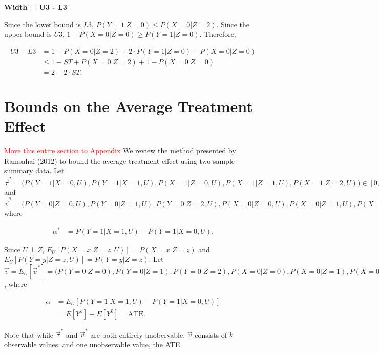 \documentclass[
]{article}
\theoremstyle{plain}
\begin{document}
\textbf{Width = U3 - L3}

Since the lower bound is \(L3\), \(P(Y = 1 | Z = 0) \le P(X = 0 | Z = 2)\). Since the upper bound is \(U3\), \(1 - P(X = 0 | Z = 0) \ge P(Y = 1 | Z = 0)\). Therefore,

\[\begin{aligned}
U3 - L3 &= 1 + P(X = 0 | Z = 2) + 2\cdot P(Y = 1 | Z = 0) - P(X = 0 | Z = 0) \\
        &\le 1 - ST + P(X = 0 | Z = 2) + 1 - P(X = 0 | Z = 0) \\
        &= 2 - 2\cdot ST.
\end{aligned}\]

\newpage

\hypertarget{bounds-on-average-treatment-effect}{%
\section{Bounds on the Average Treatment Effect}\label{bounds-on-average-treatment-effect}}
\textcolor{red}{Move this entire section to Appendix}
We review the method presented by Ramsahai (2012) to bound the average treatment effect using two-sample summary data. Let \(\vec{\tau}^* = \Big(P(Y = 1 | X = 0, U), P(Y = 1 | X = 1, U), P(X = 1 | Z = 0, U), P(X = 1 | Z = 1, U), P(X=1 | Z = 2, U) \Big) \in [0,1]^{5}\) and \(\vec{v}^* = \Big(P(Y = 0 | Z = 0, U),P(Y = 0 | Z = 1, U), P(Y = 0 | Z = 2, U), P(X = 0 | Z = 0, U),P(X = 0 | Z = 1, U), P(X=0 | Z= 2, U), \alpha^*\Big)\) where

\[
\begin{aligned}
\alpha^* &= P(Y = 1 | X = 1, U) - P(Y = 1 | X = 0, U).
\end{aligned}
\]

Since \(U \perp Z\), \(E_U[P(X = x | Z = z, U)] = P(X = x | Z = z)\) and \(E_U[P(Y = y | Z = z, U)] = P(Y = y | Z = z)\). Let \(\vec{v} = E_U[\vec{v}^*] = \Big(P(Y = 0 | Z = 0), P(Y = 0 | Z = 1),P(Y = 0 | Z = 2), P(X = 0 | Z = 0), P(X = 0 | Z = 1),P(X = 0 | Z = 2), \alpha \Big)\), where

\[
\begin{aligned}
\alpha &= E_U[P(Y = 1 | X = 1, U) - P(Y = 1 | X = 0, U)] \\
       &= E[Y^1] - E[Y^0] = \text{ATE}.
\end{aligned}
\]

Note that while \(\vec{\tau}^*\) and \(\vec{v}^*\) are both entirely unobervable, \(\vec{v}\) consists of \(k\) observable values, and one unobservable value, the ATE.
\end{document}
